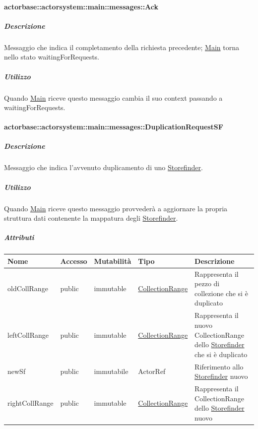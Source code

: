 \documentclass{scalatekids-article}
\begin{document}
\paragraph{actorbase::actorsystem::main::messages::Ack}
\label{sec:actorbase::actorsystem::main::messages::Ack}

\subparagraph{Descrizione}

Messaggio che indica il completamento della richiesta precedente; \hyperref[sec:actorbase::actorsystem::main::Main]{Main} torna nello stato waitingForRequests.

\subparagraph{Utilizzo}

Quando \hyperref[sec:actorbase::actorsystem::main::Main]{Main}
riceve questo messaggio cambia il suo context passando a waitingForRequests.

\paragraph{actorbase::actorsystem::main::messages::DuplicationRequestSF}
\label{sec:actorbase::actorsystem::main::messages::DuplicateRequestSF}

\subparagraph{Descrizione}

Messaggio che indica l'avvenuto duplicamento di uno \hyperref[sec:actorbase::actorsystem::storefinder::Storefinder]{Storefinder}.

\subparagraph{Utilizzo}
Quando \hyperref[sec:actorbase::actorsystem::main::Main]{Main}
riceve questo messaggio provvederà a aggiornare la propria struttura dati
contenente la mappatura degli \hyperref[sec:actorbase::actorsystem::storefinder::Storefinder]{Storefinder}.

\subparagraph{Attributi}
\begin{tabular}{| p{3cm} | p{1.5cm} | p{2cm} | p{2cm} | p{8.5cm} |}
  \hline
  Nome & Accesso & Mutabilità & Tipo & Descrizione\\
  \hline
  oldCollRange & public & immutable & \hyperref[sec:actorbase::actorsystem::utils::CollectionRange]{CollectionRange} & Rappresenta il pezzo di collezione che si è duplicato\\
  \hline
  leftCollRange & public & immutable & \hyperref[sec:actorbase::actorsystem::utils::CollectionRange]{CollectionRange} & Rappresenta il nuovo CollectionRange dello \hyperref[sec:actorbase::actorsystem::storefinder::Storefinder]{Storefinder} che si è duplicato\\
  \hline
  newSf & public & immutabile & ActorRef & Riferimento allo \hyperref[sec:actorbase::actorsystem::storefinder::Storefinder]{Storefinder} nuovo\\
  \hline
  rightCollRange & public & immutable & \hyperref[sec:actorbase::actorsystem::utils::CollectionRange]{CollectionRange} & Rappresenta il CollectionRange dello \hyperref[sec:actorbase::actorsystem::storefinder::Storefinder]{Storefinder} nuovo\\
  \hline
\end{tabular}
\end{document}
